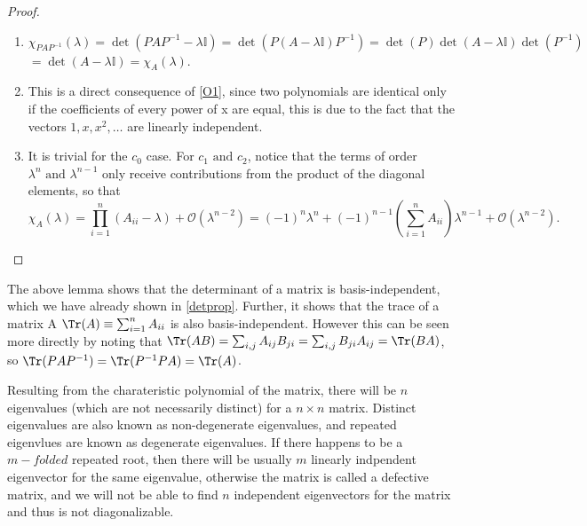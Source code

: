 \documentclass[a4paper,12pt]{report}
\begin{document}
\begin{proof}
\begin{enumerate}[label=(\(O\)\arabic*)] 
    \item \(\chi _{PAP^{-1} }(\lambda ) = \det (PAP^{-1} - \lambda \mathbb{I}) = \det (P(A-\lambda \mathbb{I})P^{-1} ) = \det (P)\det (A-\lambda \mathbb{I}) \det (P^{-1} )\) \(= \det (A - \lambda \mathbb{I}) = \chi _{A}(\lambda )  \).
    \item This is a direct consequence of \cref{O1}, since two polynomials are identical only if the coefficients of every power of x are equal, this is due to the fact that the vectors \(1, x, x^2, \ldots \) are linearly independent.
    \item It is trivial for the \(c_0 \) case. For \(c_1 \text { and } c_2 \), notice that the terms of order \(\lambda ^{n} \text { and } \lambda ^{n-1} \) only receive contributions from the product of the diagonal elements, so that
    \begin{equation}
        \chi _{A}(\lambda ) =   \prod_{i=1}^{n} (A_{ii} - \lambda  ) + \mathcal{O}(\lambda ^{n-2} ) = (-1)^{n} \lambda ^{n} + (-1)^{n-1} \left( \sum_{i=1}^{n} A_{ii}  \right) \lambda ^{n-1} + \mathcal{O}(\lambda ^{n-2} ).     
    \end{equation}
    
    
\end{enumerate}

\end{proof}

The above lemma shows that the determinant of a matrix is basis-independent, which we have already shown in \cref{detprop}. Further, it shows that the trace of a matrix A \(\Tr (A) \equiv \sum_{i=1}^{n} A_{ii}\) is also basis-independent. However this can be seen more directly by noting that \(\Tr (AB) = \sum_{i,j}^{} A_{ij} B_{ji} = \sum_{i,j}^{} B_{ji} A_{ij} = \Tr (BA)      \), so \(\Tr (PAP^{-1} ) = \Tr (P^{-1} PA) = \Tr (A)\).

Resulting from the charateristic polynomial of the matrix, there will be \(n\) eigenvalues (which are not necessarily distinct) for a \(n \times n\) matrix. Distinct eigenvalues are also known as non-degenerate eigenvalues, and repeated eigenvlues are known as degenerate eigenvalues. If there happens to be a \(m-folded\) repeated root, then there will be usually \(m\) linearly indpendent eigenvector for the same eigenvalue, otherwise the matrix is called a defective matrix, and we will not be able to find \(n\) independent eigenvectors for the matrix and thus is not diagonalizable.
\end{document}
